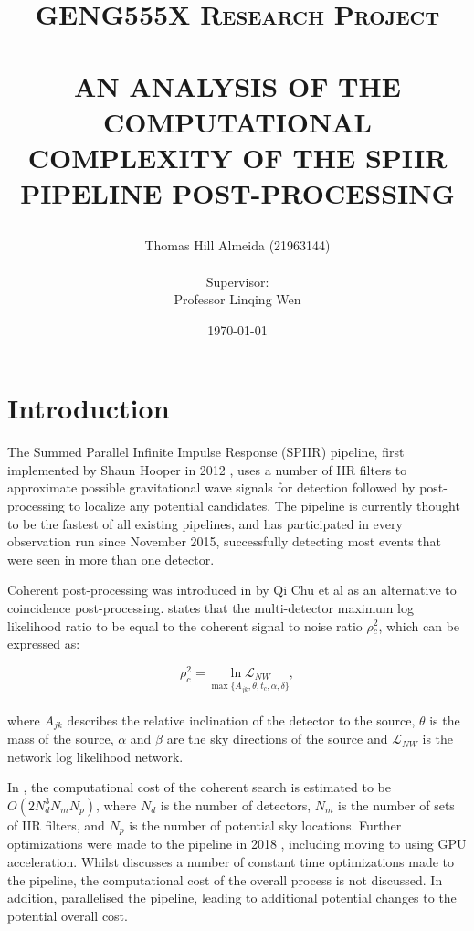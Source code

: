 \documentclass{article}
\title{\normalsize \textsc{GENG555X Research Project}
        \\ [1.5cm]
        \HRule{0.5pt} \\
        \LARGE \textbf{\uppercase{An analysis of the computational complexity of the SPIIR pipeline post-processing}}
        \HRule{2pt} \\ [0.5cm]
        \normalsize \date{\today} \vspace*{3\baselineskip}}
\author{Thomas Hill Almeida (21963144)\\
\\
Supervisor:\\
Professor Linqing Wen
}
\date{}
\begin{document}
\maketitle{}
\tableofcontents{}
\newpage{}

\section{Introduction} \label{sec:intro}

The Summed Parallel Infinite Impulse Response (SPIIR) pipeline, first implemented by Shaun Hooper in 2012 \cite{SPIIRCreate}, uses a number of IIR filters to approximate possible gravitational wave signals for detection followed by post-processing to localize any potential candidates.
The pipeline is currently thought to be the fastest of all existing pipelines, and has participated in every observation run since November 2015, successfully detecting most events that were seen in more than one detector.

Coherent post-processing was introduced in \cite{ChuThesis} by Qi Chu et al as an alternative to coincidence post-processing.
\cite{ChuThesis} states that the multi-detector maximum log likelihood ratio to be equal to the coherent signal to noise ratio \(\rho{}^2_c\), which can be expressed as:

\begin{equation}
    \rho^2_c = \underset{\max\{A_{jk},\theta,t_{c},\alpha,\delta\}}{\ln \mathcal{L}_{NW}},
\end{equation}
\\
where \(A_{jk}\) describes the relative inclination of the detector to the source, \(\theta\) is the mass of the source, \(\alpha\) and \(\beta\) are the sky directions of the source and \(\mathcal{L}_{NW}\) is the network log likelihood network.

In \cite{ChuThesis}, the computational cost of the coherent search is estimated to be \(O(2N^3_dN_mN_p)\), where \(N_d\) is the number of detectors, \(N_m\) is the number of sets of IIR filters, and \(N_p\) is the number of potential sky locations.
Further optimizations were made to the pipeline in 2018 \cite{SPIIRGPU2018}, including moving to using GPU acceleration.
Whilst \cite{SPIIRGPU2018} discusses a number of constant time optimizations made to the pipeline, the computational cost of the overall process is not discussed.
In addition, \cite{SPIIRGPU2018} parallelised the pipeline, leading to additional potential changes to the potential overall cost.
\end{document}
